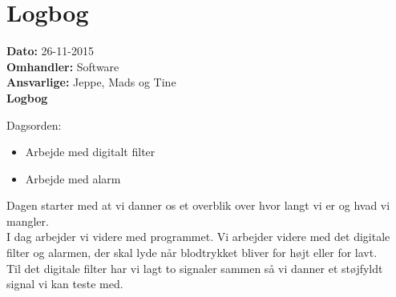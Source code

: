 \section{Logbog}

\textbf{Dato:} 26-11-2015 \\
\textbf{Omhandler:} Software \\
\textbf{Ansvarlige:} Jeppe, Mads og Tine \\
\textbf{Logbog}

Dagsorden:
\begin{itemize}
	\item Arbejde med digitalt filter
	\item Arbejde med alarm
\end{itemize}


Dagen starter med at vi danner os et overblik over hvor langt vi er og hvad vi mangler.\\
I dag arbejder vi videre med programmet. Vi arbejder videre med det digitale filter og alarmen, der skal lyde når blodtrykket bliver for højt eller for lavt.\\
Til det digitale filter har vi lagt to signaler sammen så vi danner et støjfyldt signal vi kan teste med.  

